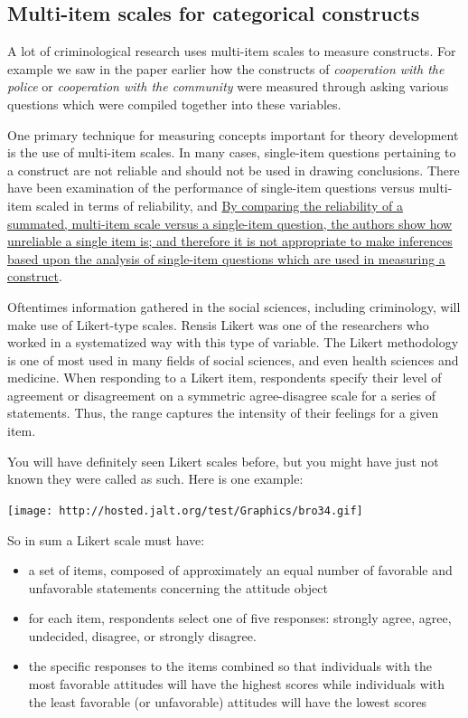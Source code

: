\documentclass[]{book}
\providecommand{\tightlist}{%
  \setlength{\itemsep}{0pt}\setlength{\parskip}{0pt}}
\theoremstyle{definition}
\theoremstyle{definition}
\theoremstyle{definition}
\theoremstyle{remark}
\begin{document}
\hypertarget{multi-item-scales-for-categorical-constructs}{%
\subsection{Multi-item scales for categorical
constructs}\label{multi-item-scales-for-categorical-constructs}}

A lot of criminological research uses multi-item scales to measure
constructs. For example we saw in the paper earlier how the constructs
of \emph{cooperation with the police} or \emph{cooperation with the
community} were measured through asking various questions which were
compiled together into these variables.

One primary technique for measuring concepts important for theory
development is the use of multi-item scales. In many cases, single-item
questions pertaining to a construct are not reliable and should not be
used in drawing conclusions. There have been examination of the
performance of single-item questions versus multi-item scaled in terms
of reliability, and
\href{https://scholarworks.iupui.edu/handle/1805/344}{By comparing the
reliability of a summated, multi-item scale versus a single-item
question, the authors show how unreliable a single item is; and
therefore it is not appropriate to make inferences based upon the
analysis of single-item questions which are used in measuring a
construct}.

Oftentimes information gathered in the social sciences, including
criminology, will make use of Likert-type scales. Rensis Likert was one
of the researchers who worked in a systematized way with this type of
variable. The Likert methodology is one of most used in many fields of
social sciences, and even health sciences and medicine. When responding
to a Likert item, respondents specify their level of agreement or
disagreement on a symmetric agree-disagree scale for a series of
statements. Thus, the range captures the intensity of their feelings for
a given item.

You will have definitely seen Likert scales before, but you might have
just not known they were called as such. Here is one example:

\texttt{[image: http://hosted.jalt.org/test/Graphics/bro34.gif]}

So in sum a Likert scale must have:

\begin{itemize}
\tightlist
\item
  a set of items, composed of approximately an equal number of favorable
  and unfavorable statements concerning the attitude object
\item
  for each item, respondents select one of five responses: strongly
  agree, agree, undecided, disagree, or strongly disagree.\\
\item
  the specific responses to the items combined so that individuals with
  the most favorable attitudes will have the highest scores while
  individuals with the least favorable (or unfavorable) attitudes will
  have the lowest scores
\end{itemize}
\end{document}

